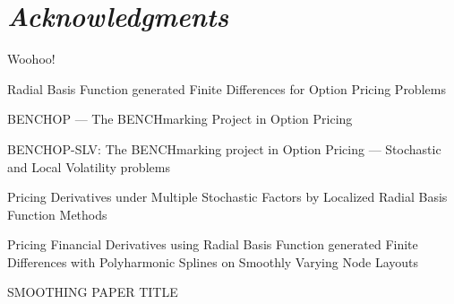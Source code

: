 \documentclass{UUThesisTemplate}
\begin{document}
{\myfont
\chapter*{\emph{Acknowledgments}}
Woohoo!
}
    \begin{listofpapers}
        \item Radial Basis Function generated Finite Differences for Option Pricing Problems \label{paper1}
    \item BENCHOP --- The BENCHmarking Project in Option Pricing  \label{paper2}
    \item BENCHOP-SLV: The BENCHmarking project in Option Pricing --- Stochastic and Local Volatility problems \label{paper4}
    \item Pricing Derivatives under Multiple Stochastic Factors by Localized Radial Basis Function Methods \label{paper3}
    \item Pricing Financial Derivatives using Radial Basis Function generated Finite Differences with Polyharmonic Splines on Smoothly Varying Node Layouts \label{paper5}
    \item SMOOTHING PAPER TITLE \label{paper6}
    \end{listofpapers}


    \begingroup
        \tableofcontents
    \endgroup

\mainmatter
%    
%    
%    

%    
%
%
\end{document}
